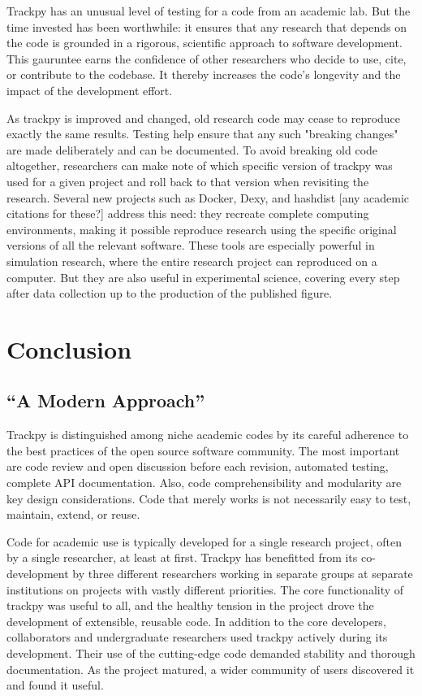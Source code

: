 Trackpy has an unusual level of testing for a code from an academic lab. But the time invested has been worthwhile: it ensures that any research that depends on the code is grounded in a rigorous, scientific approach to software development. This gauruntee earns the confidence of other researchers who decide to use, cite, or contribute to the codebase. It thereby increases the code's longevity and the impact of the development effort.

As trackpy is improved and changed, old research code may cease to reproduce exactly the same results. Testing help ensure that any such "breaking changes" are made deliberately and can be documented. To avoid breaking old code altogether, researchers can make note of which specific version of trackpy was used for a given project and roll back to that version when revisiting the research. Several new projects such as Docker, Dexy, and hashdist [any academic citations for these?] address this need: they recreate complete computing environments, making it possible reproduce research using the specific original versions of all the relevant software. These tools are especially powerful in simulation research, where the entire research project can reproduced on a computer. But they are also useful in experimental science, covering every step after data collection up to the production of the published figure.

\section{Conclusion}
\subsection{``A Modern Approach''}
Trackpy is distinguished among niche academic codes by its careful adherence to the best practices of the open source software community. The most important are code review and open discussion before each revision, automated testing, complete API documentation. Also, code comprehensibility and modularity are key design considerations. Code that merely works is not necessarily easy to test, maintain, extend, or reuse.

Code for academic use is typically developed for a single research project, often by a single researcher, at least at first. Trackpy has benefitted from its co-development by three different researchers working in separate groups at separate institutions on projects with vastly different priorities. The core functionality of trackpy was useful to all, and the healthy tension in the project drove the development of extensible, reusable code. In addition to the core developers, collaborators and undergraduate researchers used trackpy actively during its development. Their use of the cutting-edge code demanded stability and thorough documentation. As the project matured, a wider community of users discovered it and found it useful.

